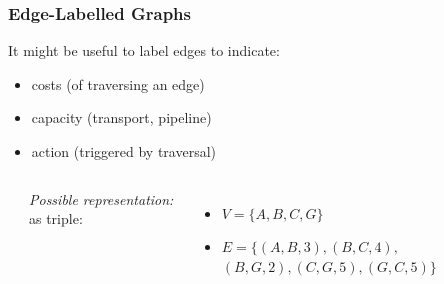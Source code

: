 \begin{frame}[fragile]\frametitle{Edge-Labelled Graphs}

  It might be useful to label edges to indicate:
  \begin{itemize}
  \item costs (of traversing an edge)
  \item capacity (transport, pipeline)
  \item action (triggered by traversal)
  \end{itemize}


  \vspace{5mm}
\begin{columns}[t]
  \begin{center}
    
  \end{center}
  \emph{Possible representation:} as triple:
  \begin{itemize}
  \item $V = \{A, B, C, G\}$
  \item $E = \{(A, B, 3), (B, C, 4),$
    $(B, G, 2), (C, G, 5), (G, C, 5) \}$
  \end{itemize}
\end{columns}

\end{frame}


